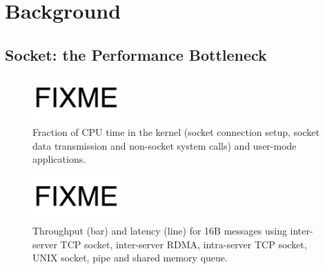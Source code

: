 \section{Background}
\label{sec:background}

\subsection{Socket: the Performance Bottleneck}
\label{subsec:bottleneck}

\begin{figure}[t]
	\centering
	\includegraphics[width=0.3\textwidth]{images/fixme}
	\caption{Fraction of CPU time in the kernel (socket connection setup, socket data transmission and non-socket system calls) and user-mode applications.}
	\label{fig:socket-kernel-time}
\end{figure}




\begin{figure}[t]
	\centering
	\includegraphics[width=0.3\textwidth]{images/fixme}
	\caption{Throughput (bar) and latency (line) for 16B messages using inter-server TCP socket, inter-server RDMA, intra-server TCP socket, UNIX socket, pipe and shared memory queue.}
	\label{fig:socket-comparison}
\end{figure}

